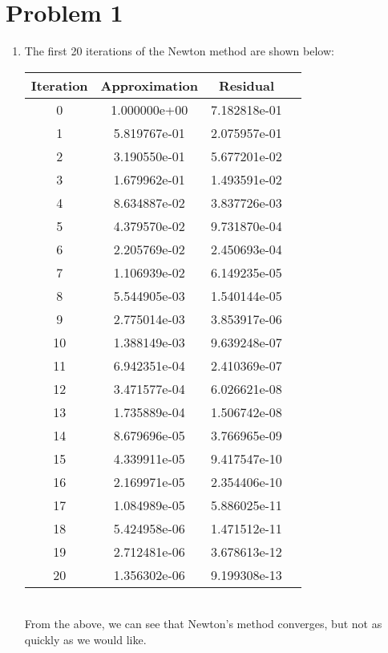 \documentclass{article}
\title{\thetitle}
\author{\theauthor}
\begin{document}
\maketitle
\section*{Problem 1}
\begin{enumerate}[label=\alph*.)]
\item The first 20 iterations of the Newton method are shown below: \\
\begin{tabular}{|c|c|c|c|}
\hline
Iteration & Approximation & Residual\\
\hline
0 & 1.000000e+00 & 7.182818e-01\\
\hline
1 & 5.819767e-01 & 2.075957e-01\\
\hline
2 & 3.190550e-01 & 5.677201e-02\\
\hline
3 & 1.679962e-01 & 1.493591e-02\\
\hline
4 & 8.634887e-02 & 3.837726e-03\\
\hline
5 & 4.379570e-02 & 9.731870e-04\\
\hline
6 & 2.205769e-02 & 2.450693e-04\\
\hline
7 & 1.106939e-02 & 6.149235e-05\\
\hline
8 & 5.544905e-03 & 1.540144e-05\\
\hline
9 & 2.775014e-03 & 3.853917e-06\\
\hline
10 & 1.388149e-03 & 9.639248e-07\\
\hline
11 & 6.942351e-04 & 2.410369e-07\\
\hline
12 & 3.471577e-04 & 6.026621e-08\\
\hline
13 & 1.735889e-04 & 1.506742e-08\\
\hline
14 & 8.679696e-05 & 3.766965e-09\\
\hline
15 & 4.339911e-05 & 9.417547e-10\\
\hline
16 & 2.169971e-05 & 2.354406e-10\\
\hline
17 & 1.084989e-05 & 5.886025e-11\\
\hline
18 & 5.424958e-06 & 1.471512e-11\\
\hline
19 & 2.712481e-06 & 3.678613e-12\\
\hline
20 & 1.356302e-06 & 9.199308e-13\\
\hline
\end{tabular} \\ 
From the above, we can see that Newton's method converges, but not as quickly as we would like. \\

\end{enumerate}
\end{document}
